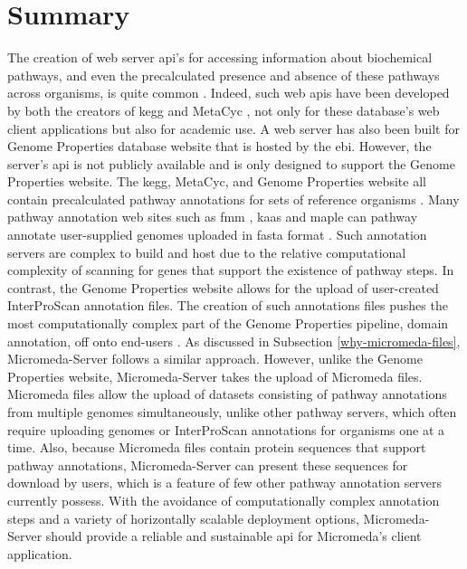 \section{Summary} \label{server-summary}

The creation of web server \gls{api}'s for accessing information about 
biochemical pathways, and even the precalculated presence and absence of these 
pathways across organisms, is quite common 
\cite{wu2006kobas,moriya2010pathpred,pireddu2006path,vallenet2009microscope,aziz2008rast,takami2016automated,moriya2007kaas,chou2009fmm}. 
Indeed, such web \gls{api}s have been developed by both the creators of 
\gls{kegg} \cite{kawashima2003kegg} and MetaCyc \cite{karp2013data}, not only 
for these database's web client applications but also for academic use. A web 
server has also been built for Genome Properties database website 
\cite{richardson2018genome} that is hosted by the \gls{ebi}. However, the 
server's \gls{api} is not publicly available and is only designed to support the 
Genome Properties website. The \gls{kegg}, MetaCyc, and Genome Properties 
website all contain precalculated pathway annotations for sets of reference 
organisms \cite{kanehisa2000kegg,karp2002metacyc,karp2013data}. Many pathway 
annotation web sites such as \gls{fmm} \cite{chou2009fmm}, \gls{kaas} 
\cite{moriya2007kaas} and \gls{maple} \cite{takami2016automated} can pathway 
annotate user-supplied genomes uploaded in \gls{fasta} format 
\cite{pearson19905}. Such annotation servers are complex to build and host due 
to the relative computational complexity of scanning for genes that support the 
existence of pathway steps. In contrast, the Genome Properties website allows 
for the upload of user-created InterProScan annotation files. The creation of 
such annotations files pushes the most computationally complex part of the 
Genome Properties pipeline, domain annotation, off onto end-users 
\cite{richardson2018genome}. As discussed in Subsection 
\ref{why-micromeda-files}, Micromeda-Server follows a similar approach. However, 
unlike the Genome Properties website, Micromeda-Server takes the upload of 
Micromeda files. Micromeda files allow the upload of datasets consisting of 
pathway annotations from multiple genomes simultaneously, unlike other pathway 
servers, which often require uploading genomes or InterProScan annotations for 
organisms one at a time. Also, because Micromeda files contain protein sequences 
that support pathway annotations, Micromeda-Server can present these sequences 
for download by users, which is a feature of few other pathway annotation servers 
currently possess. With the avoidance of computationally complex annotation 
steps and a variety of horizontally scalable deployment options, 
Micromeda-Server should provide a reliable and sustainable \gls{api} for 
Micromeda's client application.